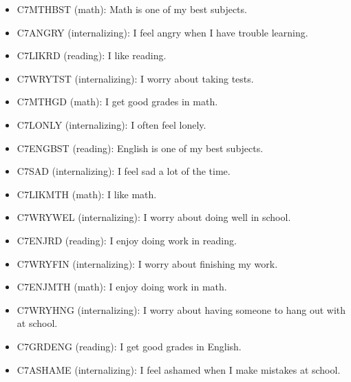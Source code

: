 \documentclass[doc,floatsintext,natbib]{apa7}
\begin{document}
\begin{itemize}

\item C7MTHBST (math): Math is one of my best subjects.

\item C7ANGRY (internalizing): I feel angry when I have trouble learning.

\item C7LIKRD (reading): I like reading.

\item C7WRYTST (internalizing): I worry about taking tests.

\item C7MTHGD (math): I get good grades in math.

\item C7LONLY (internalizing): I often feel lonely.

\item C7ENGBST (reading): English is one of my best subjects.

\item C7SAD (internalizing): I feel sad a lot of the time.

\item C7LIKMTH (math): I like math.

\item C7WRYWEL (internalizing): I worry about doing well in school.

\item C7ENJRD (reading): I enjoy doing work in reading.

\item C7WRYFIN (internalizing): I worry about finishing my work.

\item C7ENJMTH (math): I enjoy doing work in math.

\item C7WRYHNG (internalizing): I worry about having someone to hang out with at school.

\item C7GRDENG (reading): I get good grades in English.

\item C7ASHAME (internalizing): I feel ashamed when I make mistakes at school.

\end{itemize}
\end{document}
